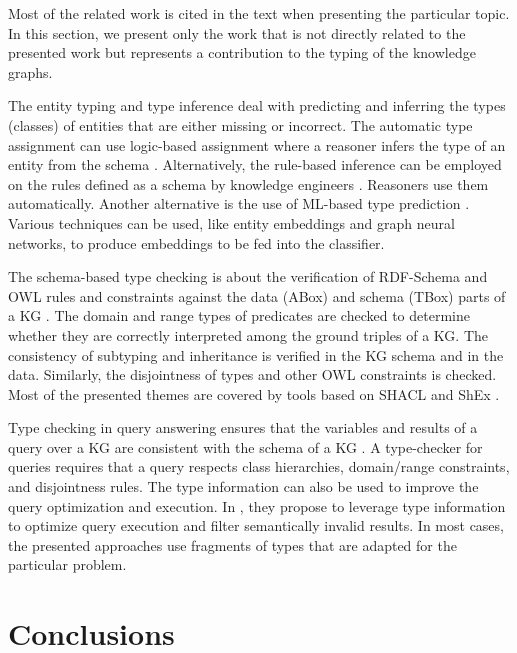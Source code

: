 \documentclass[runningheads]{llncs}
\begin{document}
Most of the related work is cited in the text when presenting the
particular topic. In this section, we present only the work that is not
directly related to the presented work but represents a contribution
to the typing of the knowledge graphs.

The entity typing and type inference deal with predicting and
inferring the types (classes) of entities that are either missing or
incorrect. The automatic type assignment can use logic-based
assignment where a reasoner infers the type of an entity from the
schema \cite{Horrocks2003}. Alternatively, the rule-based inference
can be employed on the rules defined as a schema by knowledge
engineers \cite{Horrocks2004}. Reasoners use them
automatically. Another alternative is the use of ML-based type
prediction \cite{Yaghoobzadeh2018}. Various techniques can be used, like entity embeddings and graph neural networks, to produce embeddings
to be fed into the classifier.

The schema-based type checking is about the verification of RDF-Schema
\cite{rdfschema12} and OWL \cite{owl2} rules and constraints against
the data (ABox) and schema (TBox) parts of a KG
\cite{Baader2002,Horrocks2003,OWL2Spec2012}. The domain and range
types of predicates are checked to determine whether they are correctly interpreted
among the ground triples of a KG. The consistency of subtyping and
inheritance is verified in the KG schema and in the data. Similarly,
the disjointness of types and other OWL constraints is
checked. Most of the presented themes are covered by tools based on
SHACL \cite{shacl2017} and ShEx \cite{shex2015}.

Type checking in query answering ensures that the variables and
results of a query over a KG are consistent with the schema of a KG
\cite{Zhao2017,Zhang2019}. A type-checker for queries requires that a
query respects class hierarchies, domain/range constraints, and
disjointness rules. The type information can also be used to improve
the query optimization and execution. In \cite{Kollia2013}, they
propose to leverage type information to optimize query execution and
filter semantically invalid results. In most cases, the presented
approaches use fragments of types that are adapted for the particular
problem.





\section{Conclusions\label{sec:conclude}}
\end{document}
